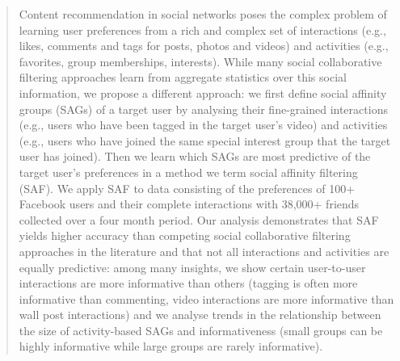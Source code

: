 \begin{quote}
Content recommendation in social networks poses the complex problem of
learning user preferences from a rich and complex set of interactions
(e.g., likes, comments and tags for posts, photos and videos) and
activities (e.g., favorites, group memberships, interests).  While
many social collaborative filtering approaches learn from aggregate statistics over this
social information, we propose a different approach: we first define
social affinity groups (SAGs) of a target user by analysing their
fine-grained interactions (e.g., users who have been tagged in the
target user's video) and activities (e.g., users who have joined the
same special interest group that the target user has joined).  Then we
learn which SAGs are most predictive of the target user's preferences
in a method we term social affinity filtering (SAF).  We apply SAF to
data consisting of the preferences of 100+ Facebook users and their
complete interactions with 38,000+ friends collected over a four month
period.  Our analysis demonstrates that SAF yields higher accuracy
than competing social collaborative filtering approaches in the literature and that not all
interactions and activities are equally predictive: among many
insights, we show certain user-to-user interactions are more
informative than others (tagging is often more informative than
commenting, video interactions are more informative than wall post
interactions) and we analyse trends in the relationship between the
size of activity-based SAGs and informativeness (small groups can be
highly informative while large groups are rarely informative).
\end{quote}
